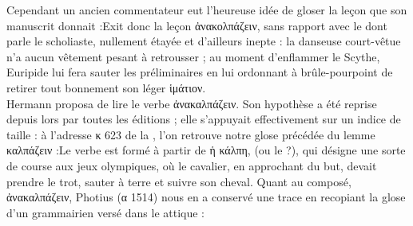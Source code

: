{Cependant un ancien commentateur eut l'heureuse idée de gloser la leçon que son manuscrit donnait :Exit donc la leçon ἀνακολπάζειν, sans rapport avec le  dont parle le scholiaste, nullement étayée et d'ailleurs inepte : la danseuse court-vêtue n'a aucun vêtement pesant à retrousser ; au moment d'enflammer le Scythe, Euripide lui fera sauter les préliminaires en lui ordonnant à brûle-pourpoint de retirer tout bonnement son léger ἱμάτιον.\\
Hermann proposa de lire le verbe ἀνακαλπάζειν. 
Son hypothèse a été reprise depuis lors par toutes les éditions ; elle s'appuyait effectivement sur un indice de taille : à l'adresse κ 623 de la , l'on retrouve notre glose précédée du lemme καλπάζειν :Le verbe est formé à partir de ἡ κάλπη,  (ou le  ?), qui désigne une sorte de course aux jeux olympiques, où le cavalier, en approchant du but, devait prendre le trot, sauter à terre et suivre son cheval.
Quant au composé, ἀνακαλπάζειν, Photius (α 1514) nous en a conservé une trace en recopiant la glose d'un grammairien versé dans le  attique :}
